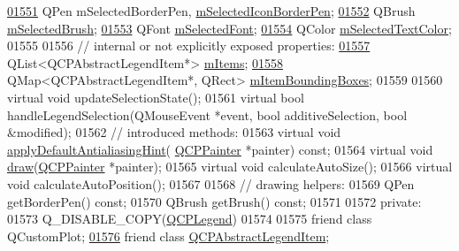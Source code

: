 \begin{DoxyCode}
\hypertarget{a00116_source_l01551}{}\hyperlink{a00045_a7429ac0e64c7b90b649b4d8f4cc5fa55}{01551}   QPen mSelectedBorderPen, \hyperlink{a00045_a7429ac0e64c7b90b649b4d8f4cc5fa55}{mSelectedIconBorderPen};
\hypertarget{a00116_source_l01552}{}\hyperlink{a00045_ab3c7567c86d4784b1e48f76a84b3a1e2}{01552}   QBrush \hyperlink{a00045_ab3c7567c86d4784b1e48f76a84b3a1e2}{mSelectedBrush};
\hypertarget{a00116_source_l01553}{}\hyperlink{a00045_a86ce8f6c20a2f51a48eaf3c24ce16805}{01553}   QFont \hyperlink{a00045_a86ce8f6c20a2f51a48eaf3c24ce16805}{mSelectedFont};
\hypertarget{a00116_source_l01554}{}\hyperlink{a00045_a6c25c8796c6e73e983aae6024965f2be}{01554}   QColor \hyperlink{a00045_a6c25c8796c6e73e983aae6024965f2be}{mSelectedTextColor};
01555   
01556   \textcolor{comment}{// internal or not explicitly exposed properties:}
\hypertarget{a00116_source_l01557}{}\hyperlink{a00045_a9ae61eaf9434d9f315696bf03c8e4455}{01557}   QList<QCPAbstractLegendItem*> \hyperlink{a00045_a9ae61eaf9434d9f315696bf03c8e4455}{mItems};
\hypertarget{a00116_source_l01558}{}\hyperlink{a00045_ae3cf93cee4fa6e7b1966e3c5597004c3}{01558}   QMap<QCPAbstractLegendItem*, QRect> \hyperlink{a00045_ae3cf93cee4fa6e7b1966e3c5597004c3}{mItemBoundingBoxes};
01559   
01560   \textcolor{keyword}{virtual} \textcolor{keywordtype}{void} updateSelectionState();
01561   \textcolor{keyword}{virtual} \textcolor{keywordtype}{bool} handleLegendSelection(QMouseEvent *event, \textcolor{keywordtype}{bool} additiveSelection, \textcolor{keywordtype}{bool} &modified);
01562   \textcolor{comment}{// introduced methods:}
01563   \textcolor{keyword}{virtual} \textcolor{keywordtype}{void} \hyperlink{a00044_afdf83ddc6a265cbf4c89fe99d3d93473}{applyDefaultAntialiasingHint}(
      \hyperlink{a00047}{QCPPainter} *painter) \textcolor{keyword}{const};
01564   \textcolor{keyword}{virtual} \textcolor{keywordtype}{void} \hyperlink{a00044_aecf2f7087482d4b6a78cb2770e5ed12d}{draw}(\hyperlink{a00047}{QCPPainter} *painter);
01565   \textcolor{keyword}{virtual} \textcolor{keywordtype}{void} calculateAutoSize();
01566   \textcolor{keyword}{virtual} \textcolor{keywordtype}{void} calculateAutoPosition();
01567   
01568   \textcolor{comment}{// drawing helpers:}
01569   QPen getBorderPen() \textcolor{keyword}{const};
01570   QBrush getBrush() \textcolor{keyword}{const};
01571   
01572 \textcolor{keyword}{private}:
01573   Q\_DISABLE\_COPY(\hyperlink{a00045}{QCPLegend})
01574   
01575   friend class QCustomPlot;
\hypertarget{a00116_source_l01576}{}\hyperlink{a00045_a8a375e31e42c68de049fcf0fd35db5b0}{01576}   friend class \hyperlink{a00023}{QCPAbstractLegendItem};

\end{DoxyCode}
